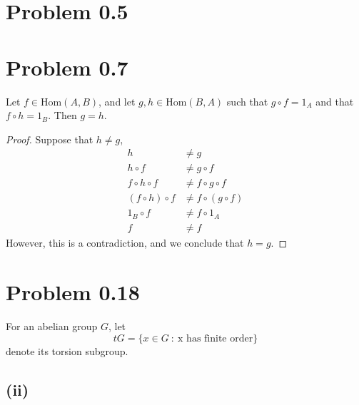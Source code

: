 \documentclass{article}
\theoremstyle{definition}
\begin{document}
\section*{Problem 0.5}
\section*{Problem 0.7}
    \begin{mdframed}[]
        Let $f \in \text{Hom}(A,B)$, and let $g,h \in \text{Hom}(B,A)$ such that $g \circ f = 1_A$ and that 
    $f \circ h = 1_B$. Then $g = h$.
    \end{mdframed}
    \begin{proof}
        Suppose that $h \neq g$,
        \begin{align*}
            h & \neq g \\
            h \circ f & \neq g \circ f \\
            f \circ h \circ f & \neq f \circ g \circ f \\
            (f \circ h) \circ f & \neq f \circ (g \circ f)\\
            1_B \circ f & \neq f \circ 1_A \\
            f & \neq f
        \end{align*}
        However, this is a contradiction, and we conclude that $h = g$.
    \end{proof}
\section*{Problem 0.18}
    \begin{mdframed}[]
        For an abelian group $G$, let 
        \[
            tG = \{x \in G \ : \ \text{x has finite order}\}
        \]
        denote its torsion subgroup.
    \end{mdframed}
    \subsection*{(ii)}
        \begin{mdframed}[]
            
        \end{mdframed}
\end{document}
